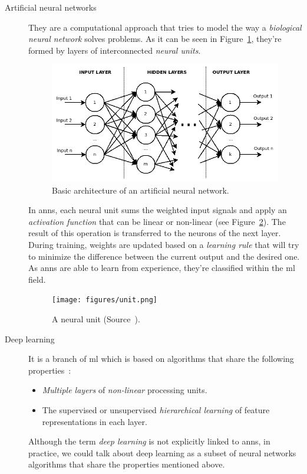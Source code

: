 \begin{description}
	\item[Artificial neural networks] They are a computational approach that tries to model the way a \emph{biological neural network} solves problems. As it can be seen in Figure~\ref{fig:ANN}, they're formed by layers of interconnected \emph{neural units}.
	\begin{figure}
		\centering
		\includegraphics[width=0.8\linewidth, keepaspectratio]{figures/ANN.png}
		\caption{Basic architecture of an artificial neural network.}
		\label{fig:ANN}
	\end{figure}
	
	In \glspl{ann}, each neural unit sums the weighted input signals and apply an \emph{activation function} that can be linear or non-linear (see Figure~\ref{fig:unit}). The result of this operation is transferred to the neurons of the next layer. During training, weights are updated based on a \emph{learning rule} that will try to minimize the difference between the current output and the desired one. As \glspl{ann} are able to learn from experience, they're classified within the \gls{ml} field.
	\begin{figure}
		\centering
		\texttt{[image: figures/unit.png]}
		\caption[A neural unit.]{A neural unit (Source~\cite{neural-unit}).}
		\label{fig:unit}
	\end{figure}
\end{description}
\begin{description}
	\item[Deep learning] It is a branch of \gls{ml} which is based on algorithms that share the following properties~\cite{deep-learning-methods-and-applications}:
	\begin{itemize}
		\item \emph{Multiple layers} of \emph{non-linear} processing units.
		\item The supervised or unsupervised \emph{hierarchical learning} of feature representations in each layer.
	\end{itemize}
	
	Although the term \textit{deep learning} is not explicitly linked to \glspl{ann}, in practice, we could talk about deep learning as a subset of neural networks algorithms that share the properties mentioned above. 
\end{description}
